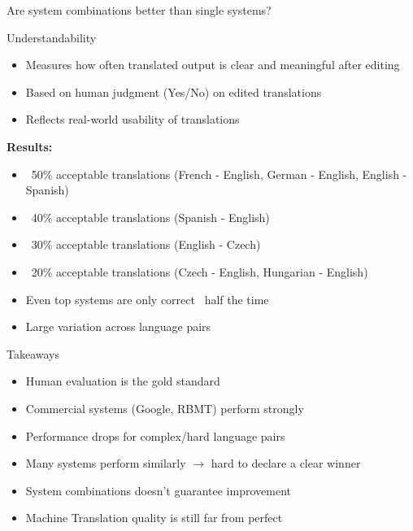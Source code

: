 \begin{frame}{Are system combinations better than single systems?}
\begin{block}{Understandability}
\begin{itemize}
    \item Measures how often translated output is clear and meaningful after editing
    \item Based on human judgment (Yes/No) on edited translations
    \item Reflects real-world usability of translations
\end{itemize}
\end{block}

\vfill
\textbf{Results:}
\begin{itemize}
    \item ~50\% acceptable translations (French - English, German - English, English - Spanish)
    \item ~40\% acceptable translations (Spanish - English)
    \item ~30\% acceptable translations (English - Czech)
    \item ~20\% acceptable translations (Czech - English, Hungarian - English)
\end{itemize}

\vfill
\begin{itemize}
    \item Even top systems are only correct ~half the time
    \item Large variation across language pairs
\end{itemize}
\end{frame}

\begin{frame}{Takeaways}
\begin{itemize}
    \item Human evaluation is the gold standard
    \item Commercial systems (Google, RBMT) perform strongly
    \item Performance drops for complex/hard language pairs
    \item Many systems perform similarly $\rightarrow$ hard to declare a clear winner
    \item System combinations doesn’t guarantee improvement
    \item Machine Translation quality is still far from perfect
\end{itemize}
\end{frame}
